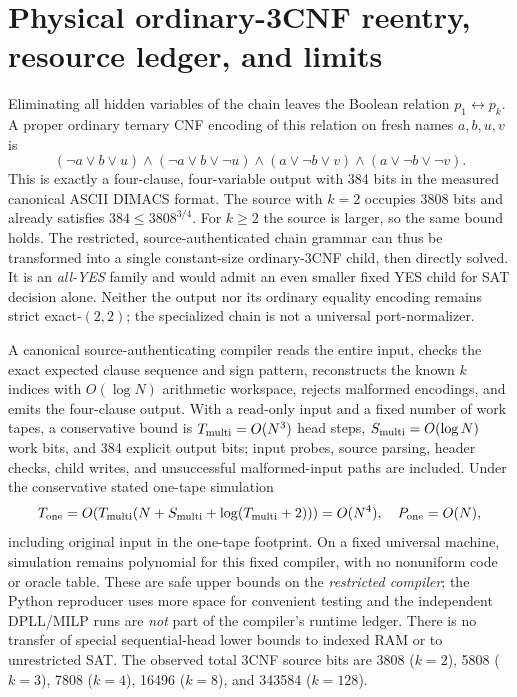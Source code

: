 \documentclass[11pt]{article}
\begin{document}
\section{Physical ordinary-3CNF reentry, resource ledger, and limits}
Eliminating all hidden variables of the chain leaves the Boolean relation $p_1\leftrightarrow p_k$. A proper ordinary ternary CNF encoding of this relation on fresh names $a,b,u,v$ is
\[
 (\neg a\lor b\lor u)\land(\neg a\lor b\lor\neg u)\land
 (a\lor\neg b\lor v)\land(a\lor\neg b\lor\neg v).
\]
This is exactly a four-clause, four-variable output with 384 bits in the measured canonical ASCII DIMACS format. The source with $k=2$ occupies 3808 bits and already satisfies $384\le3808^{3/4}$. For $k\ge2$ the source is larger, so the same bound holds. The restricted, source-authenticated chain grammar can thus be transformed into a single constant-size ordinary-3CNF child, then directly solved. It is an \emph{all-YES} family and would admit an even smaller fixed YES child for SAT decision alone. Neither the output nor its ordinary equality encoding remains strict exact-$(2,2)$; the specialized chain is not a universal port-normalizer.

A canonical source-authenticating compiler reads the entire input, checks the exact expected clause sequence and sign pattern, reconstructs the known $k$ indices with $O(\log N)$ arithmetic workspace, rejects malformed encodings, and emits the four-clause output. With a read-only input and a fixed number of work tapes, a conservative bound is $T_{\rm multi}=O(N^3)$ head steps, $S_{\rm multi}=O(\log N)$ work bits, and 384 explicit output bits; input probes, source parsing, header checks, child writes, and unsuccessful malformed-input paths are included. Under the conservative stated one-tape simulation
\[
 T_{\rm one}=O(T_{\rm multi}(N+S_{\rm multi}+\log(T_{\rm multi}+2)))=O(N^4),
 \quad P_{\rm one}=O(N),
\]
including original input in the one-tape footprint. On a fixed universal machine, simulation remains polynomial for this fixed compiler, with no nonuniform code or oracle table. These are safe upper bounds on the \emph{restricted compiler}; the Python reproducer uses more space for convenient testing and the independent DPLL/MILP runs are \emph{not} part of the compiler's runtime ledger. There is no transfer of special sequential-head lower bounds to indexed RAM or to unrestricted SAT. The observed total 3CNF source bits are 3808 ($k=2$), 5808 ($k=3$), 7808 ($k=4$), 16496 ($k=8$), and 343584 ($k=128$).
\end{document}
